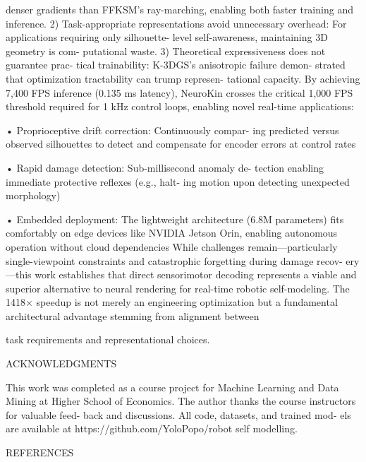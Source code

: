 \documentclass[10pt,twocolumn,letterpaper]{article}
\begin{document}
denser gradients than FFKSM’s ray-marching, enabling both faster training and inference. 2) Task-appropriate representations avoid unnecessary overhead: For applications requiring only silhouette- level self-awareness, maintaining 3D geometry is com- putational waste. 3) Theoretical expressiveness does not guarantee prac- tical trainability: K-3DGS’s anisotropic failure demon- strated that optimization tractability can trump represen- tational capacity. By achieving 7,400 FPS inference (0.135 ms latency), NeuroKin crosses the critical 1,000 FPS threshold required for 1 kHz control loops, enabling novel real-time applications:

• Proprioceptive drift correction: Continuously compar- ing predicted versus observed silhouettes to detect and compensate for encoder errors at control rates

• Rapid damage detection: Sub-millisecond anomaly de- tection enabling immediate protective reflexes (e.g., halt- ing motion upon detecting unexpected morphology)

• Embedded deployment: The lightweight architecture (6.8M parameters) fits comfortably on edge devices like NVIDIA Jetson Orin, enabling autonomous operation without cloud dependencies While challenges remain—particularly single-viewpoint constraints and catastrophic forgetting during damage recov- ery—this work establishes that direct sensorimotor decoding represents a viable and superior alternative to neural rendering for real-time robotic self-modeling. The 1418× speedup is not merely an engineering optimization but a fundamental architectural advantage stemming from alignment between

task requirements and representational choices.

ACKNOWLEDGMENTS

This work was completed as a course project for Machine Learning and Data Mining at Higher School of Economics. The author thanks the course instructors for valuable feed- back and discussions. All code, datasets, and trained mod- els are available at https://github.com/YoloPopo/robot self modelling.

REFERENCES
\end{document}
